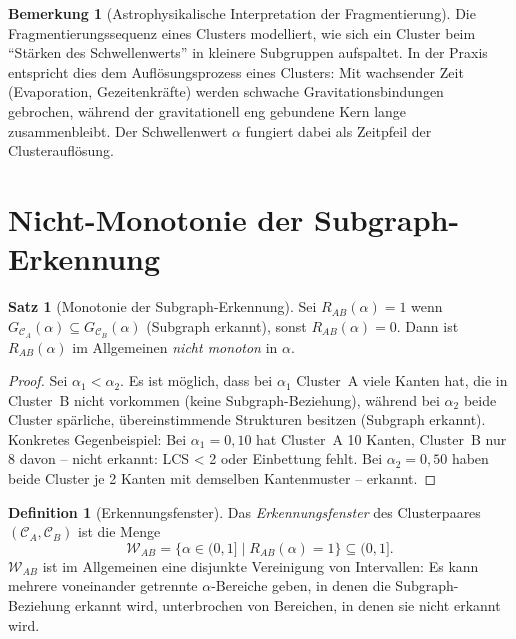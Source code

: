 ﻿\documentclass[a4paper,12pt]{report}
\theoremstyle{definition}
\newtheorem{definition}{Definition}
\newtheorem{satz}{Satz}
\newtheorem{bemerkung}{Bemerkung}
\begin{document}
\begin{bemerkung}[Astrophysikalische Interpretation der Fragmentierung]
Die Fragmentierungssequenz eines Clusters modelliert, wie sich ein Cluster beim ``Stärken des Schwellenwerts'' in kleinere Subgruppen aufspaltet. In der Praxis entspricht dies dem Auflösungsprozess eines Clusters: Mit wachsender Zeit (Evaporation, Gezeitenkräfte) werden schwache Gravitationsbindungen gebrochen, während der gravitationell eng gebundene Kern lange zusammenbleibt. Der Schwellenwert $\alpha$ fungiert dabei als Zeitpfeil der Clusterauflösung.
\end{bemerkung}

\section{Nicht-Monotonie der Subgraph-Erkennung}
\label{sec:nichtmonotonie}

\begin{satz}[Monotonie der Subgraph-Erkennung]
\label{satz:nicht_monotonie}
Sei $R_{AB}(\alpha) = 1$ wenn $G_{\mathcal{C}_A}(\alpha) \subseteq G_{\mathcal{C}_B}(\alpha)$ (Subgraph erkannt), sonst $R_{AB}(\alpha) = 0$. Dann ist $R_{AB}(\alpha)$ im Allgemeinen \emph{nicht monoton} in $\alpha$.
\end{satz}

\begin{proof}
Sei $\alpha_1 < \alpha_2$. Es ist möglich, dass bei $\alpha_1$ Cluster~A viele Kanten hat, die in Cluster~B nicht vorkommen (keine Subgraph-Beziehung), während bei $\alpha_2$ beide Cluster spärliche, übereinstimmende Strukturen besitzen (Subgraph erkannt). Konkretes Gegenbeispiel: Bei $\alpha_1 = 0{,}10$ hat Cluster~A 10 Kanten, Cluster~B nur 8 davon -- nicht erkannt: LCS < 2 oder Einbettung fehlt. Bei $\alpha_2 = 0{,}50$ haben beide Cluster je 2 Kanten mit demselben Kantenmuster -- erkannt.
\end{proof}

\begin{definition}[Erkennungsfenster]
\label{def:erkennungsfenster}
Das \emph{Erkennungsfenster} des Clusterpaares $(\mathcal{C}_A, \mathcal{C}_B)$ ist die Menge
\[
\mathcal{W}_{AB} = \{\alpha \in (0,1] \mid R_{AB}(\alpha) = 1\} \subseteq (0,1].
\]
$\mathcal{W}_{AB}$ ist im Allgemeinen eine disjunkte Vereinigung von Intervallen: Es kann mehrere voneinander getrennte $\alpha$-Bereiche geben, in denen die Subgraph-Beziehung erkannt wird, unterbrochen von Bereichen, in denen sie nicht erkannt wird.
\end{definition}
\end{document}

